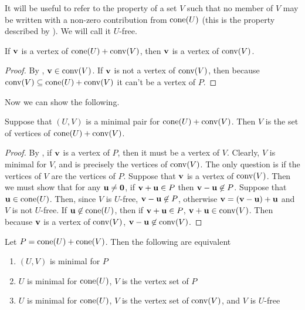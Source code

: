It will be useful to refer to the property of a set $V$ such that no member of $V$ may be written with a non-zero contribution from $\operatorname{cone}(U)$ (this is the property described by ).  We will call it $U$-free.

\begin{Prop}\label{v_is_vert}
	If $\mathbf{v}$ is a vertex of $\operatorname{cone}(U) + \operatorname{conv}(V)$, then $\mathbf{v}$ is a vertex of $\operatorname{conv}(V)$.
\end{Prop}

\begin{proof}
	By , $\mathbf{v}\in\operatorname{conv}(V)$.  If $\mathbf{v}$ is not a vertex of $\operatorname{conv}(V)$, then because $\operatorname{conv}(V) \subseteq \operatorname{cone}(U) + \operatorname{conv}(V)$ it can't be a vertex of $P$.
\end{proof}

Now we can show the following.
\begin{Prop}\label{v_min}
	Suppose that $(U,V)$ is a minimal pair for $\operatorname{cone}(U) + \operatorname{conv}(V)$.  Then $V$ is the set of vertices of $\operatorname{cone}(U) + \operatorname{conv}(V)$.
\end{Prop}

\begin{proof}
	By , if $\mathbf{v}$ is a vertex of $P$, then it must be a vertex of $V$.  Clearly, $V$ is minimal for $V$, and is precisely the vertices of $\operatorname{conv}(V)$.  The only question is if the vertices of $V$ are the vertices of $P$.  Suppose that $\mathbf{v}$ is a vertex of $\operatorname{conv}(V)$.  Then we must show that for any $\mathbf{u}\neq\mathbf{0}$, if $\mathbf{v}+\mathbf{u}\in P$ then $\mathbf{v}-\mathbf{u}\not\in P$.  Suppose that $\mathbf{u}\in\operatorname{cone}(U)$.  Then, since $V$ is $U$-free, $\mathbf{v}-\mathbf{u}\not\in P$, otherwise $\mathbf{v}=(\mathbf{v}-\mathbf{u})+\mathbf{u}$ and $V$ is not $U$-free.  If $\mathbf{u}\not\in\operatorname{cone}(U)$, then if $\mathbf{v}+\mathbf{u}\in P$, $\mathbf{v}+\mathbf{u}\in\operatorname{conv}(V)$.  Then because $\mathbf{v}$ is a vertex of $\operatorname{conv}(V)$, $\mathbf{v}-\mathbf{u}\not\in\operatorname{conv}(V)$.
\end{proof}

\begin{Prop}
	Let $P = \operatorname{cone}(U)+ \operatorname{cone}(V)$.  Then the following are equivalent
	\begin{enumerate}
		\item $(U,V)$ is minimal for $P$
		\item $U$ is minimal for $\operatorname{cone}(U)$, $V$ is the vertex set of $P$
		\item $U$ is minimal for $\operatorname{cone}(U)$, $V$ is the vertex set of $\operatorname{conv}(V)$, and $V$ is $U$-free
	\end{enumerate}
\end{Prop}

